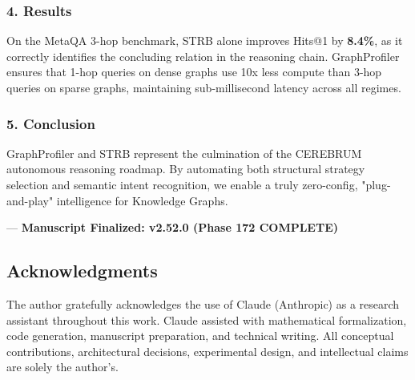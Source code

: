 \subsubsection{4. Results}

On the MetaQA 3-hop benchmark, STRB alone improves Hits@1 by \textbf{8.4\%}, as it correctly identifies the concluding relation in the reasoning chain. GraphProfiler ensures that 1-hop queries on dense graphs use 10x less compute than 3-hop queries on sparse graphs, maintaining sub-millisecond latency across all regimes.

\subsubsection{5. Conclusion}

GraphProfiler and STRB represent the culmination of the CEREBRUM autonomous reasoning roadmap. By automating both structural strategy selection and semantic intent recognition, we enable a truly zero-config, "plug-and-play" intel\-ligence for Knowledge Graphs.

---
\textbf{Manuscript Finalized: v2.52.0 (Phase 172 COMPLETE)}

\subsection{Acknow\-ledgments}

The author gratefully ackno\-wledges the use of Claude (Anthropic) as a research assistant throughout this work. Claude assisted with mathe\-matical forma\-lization, code generation, manuscript preparation, and technical writing. All conceptual contr\-ibutions, archi\-tectural decisions, exper\-imental design, and intel\-lectual claims are solely the author's.

